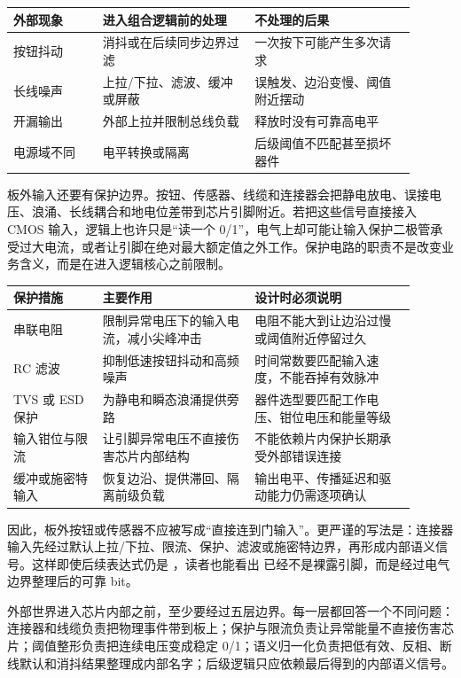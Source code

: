 \begin{longtable}{L{0.2\linewidth}L{0.34\linewidth}L{0.36\linewidth}}
\toprule
外部现象 & 进入组合逻辑前的处理 & 不处理的后果 \\
\midrule
按钮抖动 & 消抖或在后续同步边界过滤 & 一次按下可能产生多次请求 \\
长线噪声 & 上拉/下拉、滤波、缓冲或屏蔽 & 误触发、边沿变慢、阈值附近摆动 \\
开漏输出 & 外部上拉并限制总线负载 & 释放时没有可靠高电平 \\
电源域不同 & 电平转换或隔离 & 后级阈值不匹配甚至损坏器件 \\
\bottomrule
\end{longtable}

板外输入还要有保护边界。按钮、传感器、线缆和连接器会把静电放电、误接电压、浪涌、长线耦合和地电位差带到芯片引脚附近。若把这些信号直接接入 CMOS 输入，逻辑上也许只是“读一个 0/1”，电气上却可能让输入保护二极管承受过大电流，或者让引脚在绝对最大额定值之外工作。保护电路的职责不是改变业务含义，而是在进入逻辑核心之前限制。

\begin{longtable}{L{0.2\linewidth}L{0.34\linewidth}L{0.36\linewidth}}
\toprule
保护措施 & 主要作用 & 设计时必须说明 \\
\midrule
串联电阻 & 限制异常电压下的输入电流，减小尖峰冲击 & 电阻不能大到让边沿过慢或阈值附近停留过久 \\
RC 滤波 & 抑制低速按钮抖动和高频噪声 & 时间常数要匹配输入速度，不能吞掉有效脉冲 \\
TVS 或 ESD 保护 & 为静电和瞬态浪涌提供旁路 & 器件选型要匹配工作电压、钳位电压和能量等级 \\
输入钳位与限流 & 让引脚异常电压不直接伤害芯片内部结构 & 不能依赖片内保护长期承受外部错误连接 \\
缓冲或施密特输入 & 恢复边沿、提供滞回、隔离前级负载 & 输出电平、传播延迟和驱动能力仍需逐项确认 \\
\bottomrule
\end{longtable}

因此，板外按钮或传感器不应被写成“直接连到门输入”。更严谨的写法是：连接器输入先经过默认上拉/下拉、限流、保护、滤波或施密特边界，再形成内部语义信号。这样即使后续表达式仍是 ，读者也能看出  已经不是裸露引脚，而是经过电气边界整理后的可靠 bit。

外部世界进入芯片内部之前，至少要经过五层边界。每一层都回答一个不同问题：连接器和线缆负责把物理事件带到板上；保护与限流负责让异常能量不直接伤害芯片；阈值整形负责把连续电压变成稳定 0/1；语义归一化负责把低有效、反相、断线默认和消抖结果整理成内部名字；后级逻辑只应依赖最后得到的内部语义信号。

